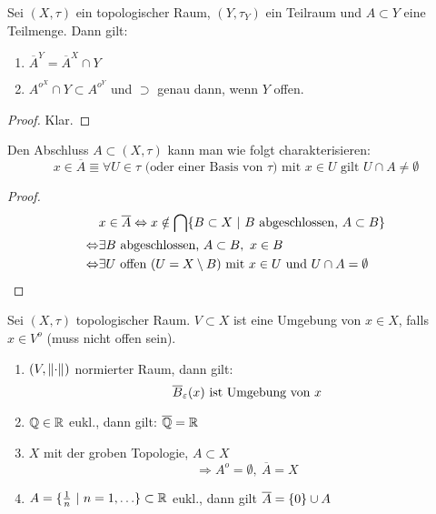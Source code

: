 \begin{stz}
    Sei $(X,\tau)$ ein topologischer Raum, $(Y,\tau_Y)$ ein Teilraum und $A\subset Y$
    eine Teilmenge. Dann gilt:
    \begin{enumerate}
        \item $\overline{A}^Y = \overline{A}^X \cap Y$
        \item $A^{o^X} \cap Y \subset A^{o^Y}$ und $\supset$ genau dann, wenn $Y$ offen.
    \end{enumerate}
    \begin{proof}
        Klar.
    \end{proof}
\end{stz}

\begin{stz}
    Den Abschluss $A\subset(X,\tau)$ kann man wie folgt charakterisieren:
    \[x\in \overline{A} \Equiv \forall U\in \tau\text{ (oder einer Basis von $\tau$)
      mit } x\in U \text{ gilt } U\cap A \neq \emptyset\]
\begin{proof}
    \begin{align*}
        & x\in\overline{A} \Equiv x\notin
            \bigcap \mdef[B\subset X]{B \text{ abgeschlossen, } A\subset B} \\
        \Equiv & \exists B \text{ abgeschlossen, } A\subset B,\ x\in B \\
        \Equiv & \exists U \text{ offen (}U = X\setminus B\text{) mit } x\in U
            \text{ und } U\cap A = \emptyset
    \end{align*}
\end{proof}
\end{stz}

\begin{dfn}
    Sei $(X,\tau)$ topologischer Raum. $V\subset X$ ist eine Umgebung von $x\in X$,
    falls $x\in V^o$ (muss nicht offen sein).

    \begin{bsp}
        \begin{enumerate}
            \item $(V,\norm{\cdot})$ normierter Raum, dann gilt:
                \[\overline{B}_\varepsilon(x) \text{ ist Umgebung von } x\]
            \item $\mathbb{Q}\in \mathbb{R}$ eukl., dann gilt: $\overline{\mathbb{Q}}=\mathbb{R}$
            \item $X$ mit der groben Topologie, $A\subset X$
                \[\Rightarrow A^o = \emptyset,\ \overline{A} = X\]
            \item $A=\mdef[\frac{1}{n}]{n = 1, \ldots}\subset\R$ eukl., dann gilt
                $\overline{A} = \mdef{0} \cup A$
        \end{enumerate}
    \end{bsp}
\end{dfn}

